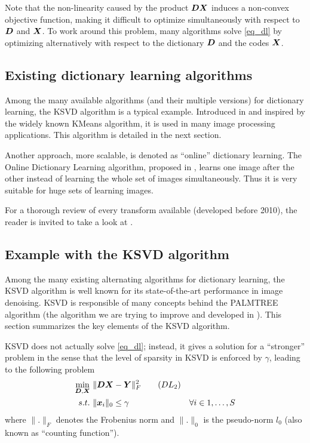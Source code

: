 Note that the non-linearity caused by the product $\bm{D}\bm{X}$ induces a non-convex objective function, making it difficult to optimize simultaneously with respect to $\bm{D}$ and $\bm{X}$. To work around this problem, many algorithms solve \eqref{eq_dl} by optimizing alternatively with respect to the dictionary $\bm{D}$ and the codes $\bm{X}$.

\subsection{Existing dictionary learning algorithms}
Among the many available algorithms (and their multiple versions) for dictionary learning, the \ac{KSVD} algorithm is a typical example. Introduced in \cite{aharon_k-svd:_2006} and inspired by the widely known \gls{KMeans} algorithm, it is used in many image processing applications. This algorithm is detailed in the next section.

\noindent
Another approach, more scalable, is denoted as “online” dictionary learning. The Online Dictionary Learning algorithm, proposed in \cite{mairal_online_2010}, learns one image after the other instead of learning the whole set of images simultaneously. Thus it is very suitable for huge sets of learning images.

\noindent
For a thorough review of every transform available (developed before 2010), the reader is invited to take a look at  \cite{rubinstein_dictionaries_2010}.


\subsection{Example with the \acs{KSVD} algorithm}

Among the many existing alternating algorithms for dictionary learning, the \ac{KSVD} algorithm is well known for its state-of-the-art performance in image denoising. \ac{KSVD} is responsible of many concepts behind the \acs{PALMTREE} algorithm (the algorithm we are trying to improve and developed in \cite{chabiron_optimization_2016}). This section summarizes the key elements of the \ac{KSVD} algorithm.

\ac{KSVD} does not actually solve \eqref{eq_dl}; instead, it gives a solution for a “stronger” problem in the sense that the level of sparsity in \ac{KSVD} is enforced by $\gamma$, leading to the following problem
\begin{align*}
\underset{\bm{D},\bm{X}}{\min}~ & \lVert \bm{D}\bm{X}-\bm{Y} \rVert^2_F \tag{$DL_2$}\label{eq_dl_ksvd} \\
s.t.~& \lVert \bm{x}_i \rVert_0 \le \gamma & \forall i \in 1,\dots,S
\end{align*}
where $\lVert . \rVert_F$ denotes the Frobenius norm and $\lVert . \rVert_0$ is the pseudo-norm $l_0$ (also known as “counting function”).

